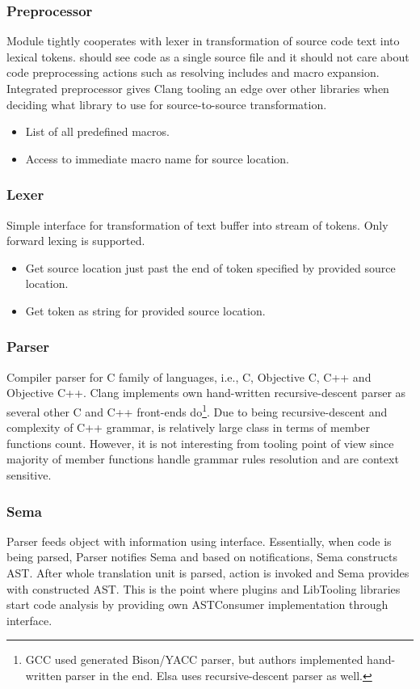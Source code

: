 \subsubsection{Preprocessor}
Module tightly cooperates with lexer in transformation of source code text into lexical tokens.  should see code as a single source file and it should not care about code preprocessing actions such as resolving includes and macro expansion. Integrated preprocessor gives Clang tooling an edge over other libraries when deciding what library to use for source-to-source transformation.

\begin{itemize}
\item List of all predefined macros.
\item Access to immediate macro name for source location.
\end{itemize}

\subsubsection{Lexer}
Simple interface for transformation of text buffer into stream of tokens. Only forward lexing is supported.

\begin{itemize}
\item Get source location just past the end of token specified by provided source location.
\item Get token as string for provided source location.
\end{itemize}

\subsubsection{Parser}
Compiler parser for C family of languages, i.e., C, Objective C, C++ and Objective C++. Clang implements own hand-written recursive-descent parser as several other C and C++ front-ends do\footnote{GCC used generated Bison/YACC parser, but authors implemented hand-written parser in the end. Elsa uses recursive-descent parser as well.}. Due to being recursive-descent and complexity of C++ grammar,  is relatively large class in terms of member functions count. However, it is not interesting from tooling point of view since majority of member functions handle grammar rules resolution and are context sensitive.

\subsubsection{Sema}
Parser feeds  object with information using  interface. Essentially, when code is being parsed, Parser notifies Sema and based on notifications, Sema constructs AST. After whole translation unit is parsed,  action is invoked and Sema provides  with constructed AST. This is the point where plugins and LibTooling libraries start code analysis by providing own ASTConsumer implementation through  interface.

